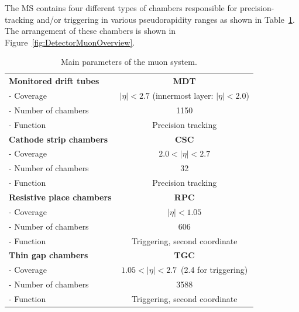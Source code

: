 The MS contains four different types of chambers responsible for precision-tracking and/or triggering in various pseudorapidity ranges as shown in Table~\ref{tab:DetectorMSOverview}. The arrangement of these chambers is shown in Figure~\ref{fig:DetectorMuonOverview}. 

\begin{table}
  \centering
  \begin{tabular}{|l|c|}
    \hline
    \textbf{Monitored drift tubes} & \textbf{MDT} \\
    - Coverage                     & $|\eta|<2.7$ (innermost layer: $|\eta|<2.0$) \\
    - Number of chambers           & 1150 \\
    - Function                     & Precision tracking \\
    \hline
    \textbf{Cathode strip chambers} & \textbf{CSC} \\
    - Coverage                      & $2.0<|\eta|<2.7$ \\
    - Number of chambers            & 32 \\
    - Function                      & Precision tracking \\
    \hline
    \textbf{Resistive place chambers} & \textbf{RPC} \\
    - Coverage                        & $|\eta|<1.05$ \\
    - Number of chambers              & 606 \\ 
    - Function                        & Triggering, second coordinate \\
    \hline
    \textbf{Thin gap chambers}        & \textbf{TGC} \\
    - Coverage                        & $1.05<|\eta|<2.7$~(2.4 for triggering) \\
    - Number of chambers              & 3588 \\
    - Function                        & Triggering, second coordinate \\
    \hline
  \end{tabular}
  \caption{Main parameters of the muon system.}
  \label{tab:DetectorMSOverview}
\end{table}

